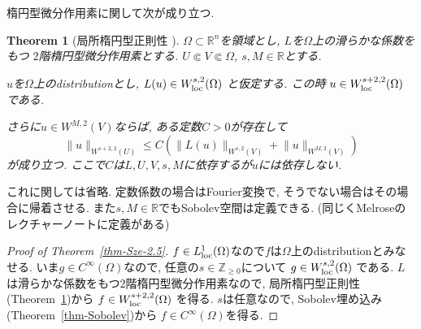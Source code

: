 \documentclass[dvipdfmx,a4paper,11pt]{article} %
\newtheorem{thm}{Theorem}[section]
\theoremstyle{definition}
\theoremstyle{remark}
\numberwithin{equation}{section}
\newcommand{\loc}{{\rm loc}}
\newcommand{\R}{\mathbb{R}}
\newcommand{\Z}{\mathbb{Z}}
\begin{document}
楕円型微分作用素に関して次が成り立つ. 
\begin{thm}
[局所楕円型正則性 {\cite[Chapter 4, Theorem 3.1]{Mel17}}]
\label{thm-local-elliptic-regularity}
$\Omega\subset\R^n$を領域とし, $L$を$\Omega$上の滑らかな係数をもつ
$2$階楕円型微分作用素とする. 
$U\Subset V\Subset\Omega$, $s,M\in\R$とする.

$u$を$\Omega$上のdistributionとし,
\(
L(u)\in W^{s,2}_{\loc}(\Omega)
\)
と仮定する. この時
\(
u\in W^{s+2,2}_{\loc}(\Omega)
\)
である.

さらに$u\in W^{M,2}(V)$ならば, ある定数$C>0$が存在して
\begin{equation}
\label{eq-local-elliptic-estimate}
\lVert u\rVert_{W^{s+2,2}(U)}
\leq
C\left(
\lVert L(u)\rVert_{W^{s,2}(V)}
+
\lVert u\rVert_{W^{M,2}(V)}
\right)
\end{equation}
が成り立つ.
ここで$C$は$L,U,V,s,M$に依存するが$u$には依存しない.
\end{thm}
これに関しては省略. 定数係数の場合はFourier変換で, そうでない場合はその場合に帰着させる. 
また$s, M \in \R$でもSobolev空間は定義できる. (同じくMelroseのレクチャーノートに定義がある)

\begin{proof}[Proof of Theorem~\ref{thm-Sze-2.5}]
$f\in L^1_{\loc}(\Omega)$なので$f$は$\Omega$上のdistributionとみなせる. 
いま$g\in C^\infty(\Omega)$なので, 任意の$s\in\Z_{\geq 0}$について
\(
g\in W^{s,2}_{\loc}(\Omega)
\)
である. 
$L$は滑らかな係数をもつ$2$階楕円型微分作用素なので, 
局所楕円型正則性(Theorem~\ref{thm-local-elliptic-regularity})から
\(
f\in W^{s+2,2}_{\loc}(\Omega)
\)
を得る. $s$は任意なので, Sobolev埋め込み(Theorem~\ref{thm-Sobolev})から
$f\in C^\infty(\Omega)$を得る.
\end{proof}
\end{document}
